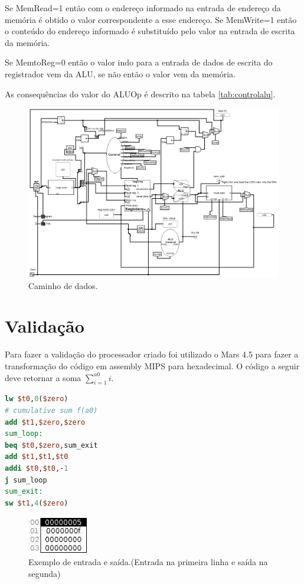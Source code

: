 \documentclass[12pt]{article}
\begin{document}
Se MemRead=1 então com o endereço informado na entrada de endereço da memória é obtido o valor correspondente a esse endereço. Se MemWrite=1 então o conteúdo do endereço informado é substituído pelo valor na entrada de escrita da memória.

Se MemtoReg=0 então o valor indo para a entrada de dados de escrita do registrador vem da ALU, se não então o valor vem da memória.

As consequências do valor do ALUOp é descrito na tabela \ref{tab:controlalu}.


\begin{figure}[htbp]
\centering
\includegraphics[width=450px]{./mips.png}
\caption{\label{fig:mips}
Caminho de dados.}
\end{figure}

\section{Validação}
\label{sec:orge619fae}

Para fazer a validação do processador criado foi utilizado o Mars 4.5 para fazer a transformação do código em assembly MIPS para hexadecimal. O código a seguir deve retornar a soma \(\sum_{i=1}^{a0}i\).

\begin{lstlisting}[language = mips]
lw $t0,0($zero)
# cumulative sum f(a0)
add $t1,$zero,$zero
sum_loop:
beq $t0,$zero,sum_exit
add $t1,$t1,$t0
addi $t0,$t0,-1
j sum_loop
sum_exit:
sw $t1,4($zero)
\end{lstlisting}


\begin{figure}[htbp]
\centering
\includegraphics[width=100px]{./example1.png}
\caption{Exemplo de entrada e saída.(Entrada na primeira linha e saída na segunda)}
\end{figure}
\end{document}
